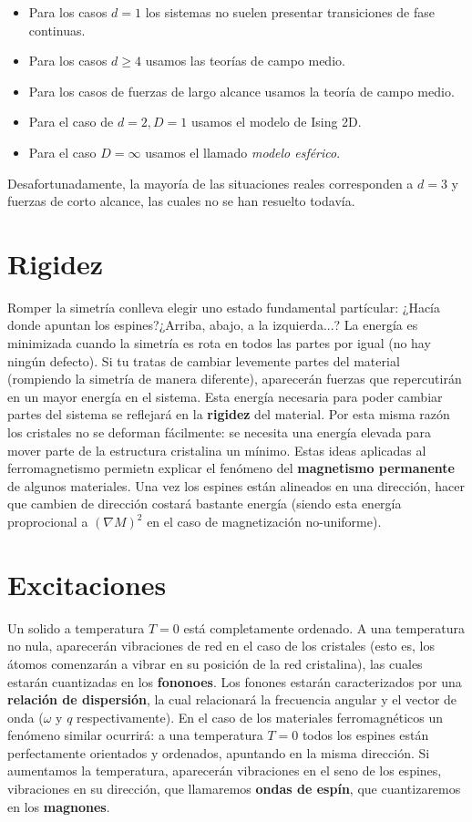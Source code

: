 \documentclass[12pt,a4paper]{book}
\numberwithin{equation}{section}
\numberwithin{figure}{section}
\begin{document}
\begin{itemize}
    \item Para los casos $d=1$ los sistemas no suelen presentar transiciones de fase continuas.
    \item Para los casos $d\geq4$ usamos las teorías de campo medio. 
    \item Para los casos de fuerzas de largo alcance usamos la teoría de campo medio. 
    \item Para el caso de $d=2,D=1$ usamos el modelo de Ising 2D. 
    \item Para el caso $D=\infty$ usamos el llamado \textit{modelo esférico}. \\
\end{itemize}

Desafortunadamente, la mayoría de las situaciones reales corresponden a $d=3$ y fuerzas de corto alcance, las cuales no se han resuelto todavía. 


\section{Rigidez}

Romper la simetría conlleva elegir uno estado fundamental partícular: ¿Hacía donde apuntan los espines?¿Arriba, abajo, a la izquierda...? La energía es minimizada cuando la simetría es rota en todos las partes por igual (no hay ningún defecto). Si tu tratas de cambiar levemente partes del material (rompiendo la simetría de manera diferente), aparecerán fuerzas que repercutirán en un mayor energía en el sistema. Esta energía necesaria para poder cambiar partes del sistema se reflejará en la \textbf{rigidez} del material. Por esta misma razón los cristales no se deforman fácilmente: se necesita una energía elevada para mover parte de la estructura cristalina un mínimo. Estas ideas aplicadas al ferromagnetismo permietn explicar el fenómeno del \textbf{magnetismo permanente} de algunos materiales. Una vez los espines están alineados en una dirección, hacer que cambien de dirección costará bastante energía (siendo esta energía proprocional a $(\nabla M)^2$ en el caso de magnetización no-uniforme).

\section{Excitaciones}

Un solido a temperatura $T=0$ está completamente ordenado. A una temperatura no nula, aparecerán vibraciones de red en el caso de los cristales (esto es, los átomos comenzarán a vibrar en su posición de la red cristalina), las cuales estarán cuantizadas en los \textbf{fononoes}. Los fonones estarán caracterizados por una \textbf{relación de dispersión}, la cual relacionará la frecuencia angular y el vector de onda ($\omega$ y $q$ respectivamente). En el caso de los materiales ferromagnéticos un fenómeno similar ocurrirá: a una temperatura $T=0$ todos los espines están perfectamente orientados y ordenados, apuntando en la misma dirección. Si aumentamos la temperatura, aparecerán vibraciones en el seno de los espines, vibraciones en su dirección, que llamaremos \textbf{ondas de espín}, que cuantizaremos en los \textbf{magnones}.  
\end{document}
